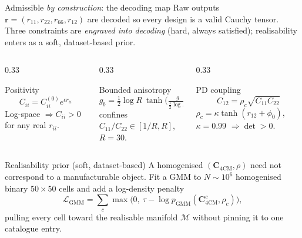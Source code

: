 \documentclass[aspectratio=169, 10pt]{beamer}
\newcommand{\mbf}[1]{\mathbf{#1}}
\newcommand{\mcl}[1]{\mathcal{#1}}
\newcommand{\Cfcm}{\mbf{C}_{\mathrm{4CM}}}
\begin{document}
\begin{frame}{Admissible \emph{by construction}: the decoding map}
  \small
  Raw outputs $\mbf{r}=(r_{11},r_{22},r_{66},r_{12})$ are decoded so every design
  is a valid Cauchy tensor. Three constraints are \emph{engraved into decoding}
  (hard, always satisfied); realisability enters as a soft, dataset-based prior.
  \begin{columns}[T]
    \begin{column}{0.33\textwidth}
      \begin{block}{Positivity}
        \[ C_{ii}=C_{ii}^{(0)}e^{\epsilon r_{ii}} \]
        Log-space $\Rightarrow C_{ii}>0$ for any real $r_{ii}$.
      \end{block}
    \end{column}
    \begin{column}{0.33\textwidth}
      \begin{block}{Bounded anisotropy}
        \[ g_b=\tfrac12\log R\,\tanh\!\Big(\tfrac{g}{\frac12\log R}\Big) \]
        confines $C_{11}/C_{22}\in[1/R,R]$, $R=30$.
      \end{block}
    \end{column}
    \begin{column}{0.33\textwidth}
      \begin{block}{PD coupling}
        \[ C_{12}=\rho_c\sqrt{C_{11}C_{22}} \]
        $\rho_c=\kappa\tanh(r_{12}{+}\phi_0)$, $\kappa=0.99$
        $\Rightarrow\det\!>\!0$.
      \end{block}
    \end{column}
  \end{columns}
  \vspace{0.4em}
  \begin{block}{Realisability prior (soft, dataset-based)}
    \small
    A homogenised $(\Cfcm,\rho)$ need not correspond to a manufacturable object.
    Fit a GMM to $N\!\sim\!10^{6}$ homogenised binary $50\times50$ cells and add a
    log-density penalty
    \[
      \mcl{L}_{\mathrm{GMM}}=\sum_c\max\!\big(0,\ \tau-\log p_{\mathrm{GMM}}(\Cfcm^{c},\rho_c)\big),
    \]
    pulling every cell toward the realisable manifold $\mcl{M}$ without pinning it
    to one catalogue entry.
  \end{block}
\end{frame}
\end{document}
